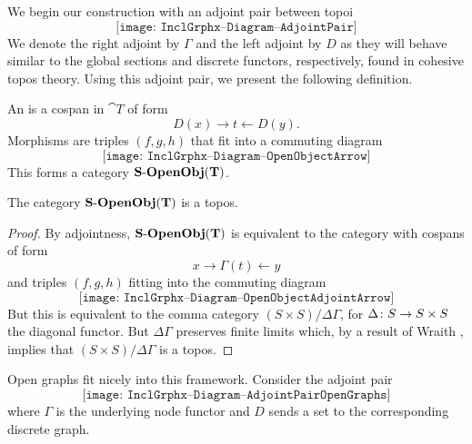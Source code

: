 We begin our construction with an
adjoint pair between topoi
\[
	\texttt{[image: InclGrphx--Diagram--AdjointPair]}
\]
We denote the right adjoint by $\Gamma$
and the left adjoint by $D$ as they
will behave similar to the global sections
and discrete functors, respectively,
found in cohesive topos theory.
Using this adjoint pair, we
present the following definition.

\begin{df}
	An  is 
	a cospan in $\cat{T}$ of form 
	\[
		D ( x ) \to t \gets D ( y ) .
	\]
	Morphisms are triples $(f,g,h)$ 
	that fit into a commuting diagram
	\[
		\texttt{[image: InclGrphx--Diagram--OpenObjectArrow]}
	\]
	This forms a category $\mathbf{S\text{-}OpenObj}(\mathbf{T})$.	
\end{df}

\begin{thm}
	The category $\mathbf{S\text{-}OpenObj}(\mathbf{T})$
	is a topos.
\end{thm}
\begin{proof}
	By adjointness, $\mathbf{S\text{-}OpenObj}(\mathbf{T})$
	is equivalent to the category with
	cospans of form 
	\[
		x \to \Gamma (t) \gets y
	\]
	and triples $(f,g,h)$ fitting into
	the commuting diagram
	\[
		\texttt{[image: InclGrphx--Diagram--OpenObjectAdjointArrow]}
	\]	
	But this is equivalent to the 
	comma category $(S \times S) / \Delta \Gamma$,
	for $\Delta \colon S \to S \times S$ the diagonal functor.
	But $\Delta \Gamma$ preserves finite limits which,
	by a result of Wraith \cite{Wraith_ArtinGlue}, implies
	that $(S \times S) / \Delta \Gamma$ is a topos.	
\end{proof}


Open graphs fit nicely into this framework.
Consider the adjoint pair
\[
	\texttt{[image: InclGrphx--Diagram--AdjointPairOpenGraphs]}
\]
where $\Gamma$ is the underlying node functor
and $D$ sends a set to the corresponding
discrete graph.  
  